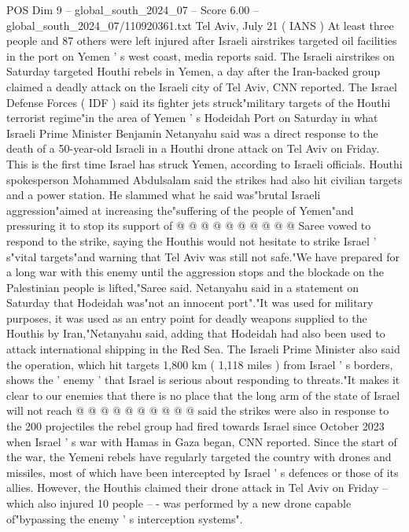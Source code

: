 \begin{textsample}{POS Dim 9 – global\_south\_2024\_07 – Score 6.00 – global\_south\_2024\_07/110920361.txt}  \label{ex:f9_pos_103}
Tel Aviv, July 21 ( IANS ) At least three people and 87 others were left injured after Israeli airstrikes targeted oil facilities in the port on Yemen ' s west coast, media reports said.
The Israeli airstrikes on Saturday targeted Houthi rebels in Yemen, a day after the Iran-backed group claimed a deadly attack on the Israeli city of Tel Aviv, CNN reported.
The Israel Defense Forces ( IDF ) said its fighter jets struck"military targets of the Houthi terrorist regime"in the area of Yemen ' s Hodeidah Port on Saturday in what Israeli Prime Minister Benjamin Netanyahu said was a direct response to the death of a 50-year-old Israeli in a Houthi drone attack on Tel Aviv on Friday.
This is the first time Israel has struck Yemen, according to Israeli officials.
Houthi spokesperson Mohammed Abdulsalam said the strikes had also hit civilian targets and a power station.
He slammed what he said was"brutal Israeli aggression"aimed at increasing the"suffering of the people of Yemen"and pressuring it to stop its support of @ @ @ @ @ @ @ @ @ @ Saree vowed to respond to the strike, saying the Houthis would not hesitate to strike Israel ' s"vital targets"and warning that Tel Aviv was still not safe."We have prepared for a long war with this enemy until the aggression stops and the blockade on the Palestinian people is lifted,"Saree said.
Netanyahu said in a statement on Saturday that Hodeidah was"not an innocent port"."It was used for military purposes, it was used as an entry point for deadly weapons supplied to the Houthis by Iran,"Netanyahu said, adding that Hodeidah had also been used to attack international shipping in the Red Sea.
The Israeli Prime Minister also said the operation, which hit targets 1,800 km ( 1,118 miles ) from Israel ' s borders, shows the ' enemy ' that Israel is serious about responding to threats."It makes it clear to our enemies that there is no place that the long arm of the state of Israel will not reach @ @ @ @ @ @ @ @ @ @ said the strikes were also in response to the 200 projectiles the rebel group had fired towards Israel since October 2023 when Israel ' s war with Hamas in Gaza began, CNN reported.
Since the start of the war, the Yemeni rebels have regularly targeted the country with drones and missiles, most of which have been intercepted by Israel ' s defences or those of its allies.
However, the Houthis claimed their drone attack in Tel Aviv on Friday -- which also injured 10 people -- - was performed by a new drone capable of"bypassing the enemy ' s interception systems".

\end{textsample}
